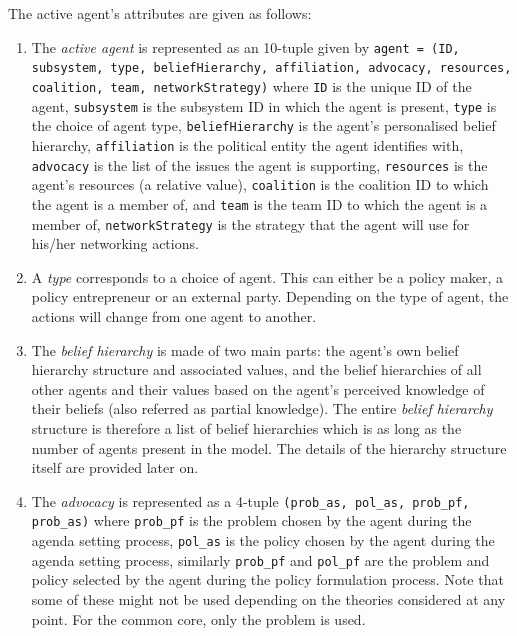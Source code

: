 The active agent's attributes are given as follows:

\begin{enumerate}

\item The \emph{active agent} is represented as an 10-tuple given by \texttt{agent = (ID, subsystem, type, beliefHierarchy, affiliation, advocacy, resources, coalition, team, networkStrategy)} where
\texttt{ID} is the unique ID of the agent,
\texttt{subsystem} is the subsystem ID in which the agent is present,  
\texttt{type} is the choice of agent type, 
\texttt{beliefHierarchy} is the agent's personalised belief hierarchy, 
\texttt{affiliation} is the political entity the agent identifies with,  
\texttt{advocacy} is the list of the issues the agent is supporting, 
\texttt{resources} is the agent's resources (a relative value), 
\texttt{coalition} is the coalition ID to which the agent is a member of, and 
\texttt{team} is the team ID to which the agent is a member of,
\texttt{networkStrategy} is the strategy that the agent will use for his/her networking actions.

\item A \emph{type} corresponds to a choice of agent. This can either be a policy maker, a policy entrepreneur or an external party. Depending on the type of agent, the actions will change from one agent to another.

\item The \emph{belief hierarchy} is made of two main parts: the agent's own belief hierarchy structure and associated values, and the belief hierarchies of all other agents and their values based on the agent's perceived knowledge of their beliefs (also referred as partial knowledge). The entire \emph{belief hierarchy} structure is therefore a list of belief hierarchies which is as long as the number of agents present in the model. The details of the hierarchy structure itself are provided later on.

\item The \emph{advocacy} is represented as a 4-tuple \texttt{(prob\_as, pol\_as, prob\_pf, prob\_as)} where \texttt{prob\_pf} is the problem chosen by the agent during the agenda setting process, \texttt{pol\_as} is the policy chosen by the agent during the agenda setting process, similarly \texttt{prob\_pf} and \texttt{pol\_pf} are the problem and policy selected by the agent during the policy formulation process. Note that some of these might not be used depending on the theories considered at any point. For the common core, only the problem is used.


\end{enumerate}
